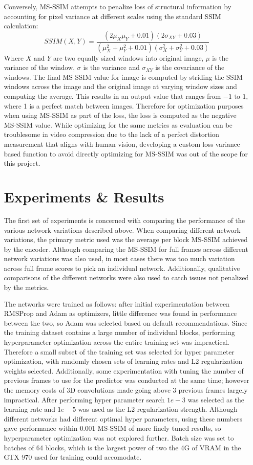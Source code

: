 \documentclass[10pt,twocolumn,letterpaper]{article}
\begin{document}
Conversely, MS-SSIM attempts to penalize loss of structural information by accounting for pixel variance at different scales using the standard SSIM calculation:
\[
  SSIM(X, Y) = \frac{(2\mu_X\mu_Y + 0.01)(2\sigma_{XY} + 0.03)}{(\mu_X^2 + \mu_Y^2 + 0.01)(\sigma_X^2 + \sigma_Y^2 + 0.03)}
\]
Where $X$ and $Y$ are two equally sized windows into original image, $\mu$ is the variance of the window, $\sigma$ is the variance and $\sigma_{XY}$ is the covariance of the windows. The final MS-SSIM value for image is computed by striding the SSIM windows across the image and the original image at varying window sizes and computing the average. This results in an output value that ranges from $-1$ to $1$, where 1 is a perfect match between images. Therefore for optimization purposes when using MS-SSIM as part of the loss, the loss is computed as the negative MS-SSIM value. While optimizing for the same metrics as evaluation can be troublesome in video compression due to the lack of a perfect distortion measurement that aligns with human vision, developing a custom loss variance based function to avoid directly optimizing for MS-SSIM was out of the scope for this project.

\section{Experiments \& Results}
The first set of experiments is concerned with comparing the performance of the various network variations described above. When comparing different network variations, the primary metric used was the average per block MS-SSIM achieved by the encoder. Although comparing the MS-SSIM for full frames across different network variations was also used, in most cases there was too much variation across full frame scores to pick an individual network. Additionally, qualitative comparisons of the different networks were also used to catch issues not penalized by the metrics.

The networks were trained as follows: after initial experimentation between RMSProp and Adam as optimizers, little difference was found in performance between the two, so Adam was selected based on default recommendations. Since the training dataset contains a large number of individual blocks, performing hyperparameter optimization across the entire training set was impractical. Therefore a small subset of the training set was selected for hyper parameter optimization, with randomly chosen sets of learning rates and L2 regularization weights selected. Additionally, some experimentation with tuning the number of previous frames to use for the predictor was conducted at the same time; however the memory costs of 3D convolutions made going above 3 previous frames largely impractical. After performing hyper parameter search $1e-3$ was selected as the learning rate and $1e-5$ was used as the L2 regularization strength. Although different networks had different optimal hyper parameters, using these numbers gave performance within 0.001 MS-SSIM of more finely tuned results, so hyperparameter optimization was not explored further. Batch size was set to batches of 64 blocks, which is the largest power of two the 4G of VRAM in the GTX 970 used for training could accomodate.
\end{document}
